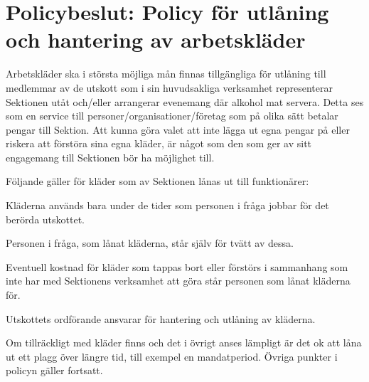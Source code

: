 \documentclass[../_main/handlingar.tex]{subfiles}
\begin{document}
\newpage
\section*{Policybeslut: Policy för utlåning och hantering av arbetskläder}
Arbetskläder ska i största möjliga mån finnas tillgängliga för utlåning till medlemmar av de utskott som i sin huvudsakliga verksamhet representerar Sektionen utåt och/eller arrangerar evenemang där alkohol mat servera. Detta ses som en service till personer/organisationer/företag som på olika sätt betalar pengar till Sektion. Att kunna göra valet att inte lägga ut egna pengar på eller riskera att förstöra sina egna kläder, är något som den som ger av sitt engagemang till Sektionen bör ha möjlighet till.

\begin{dashlist}
    \item Följande gäller för kläder som av Sektionen lånas ut till funktionärer:
    \item Kläderna används bara under de tider som personen i fråga jobbar för det berörda utskottet.
    \item Personen i fråga, som lånat kläderna, står själv för tvätt av dessa.
    \item Eventuell kostnad för kläder som tappas bort eller förstörs i sammanhang som inte har med Sektionens verksamhet att göra står personen som lånat kläderna för.
    \item Utskottets ordförande ansvarar för hantering och utlåning av kläderna.
    \item Om tillräckligt med kläder finns och det i övrigt anses lämpligt är det ok att låna ut ett plagg över längre tid, till exempel en mandatperiod. Övriga punkter i policyn gäller fortsatt.
\end{dashlist}

\newpage
\end{document}
